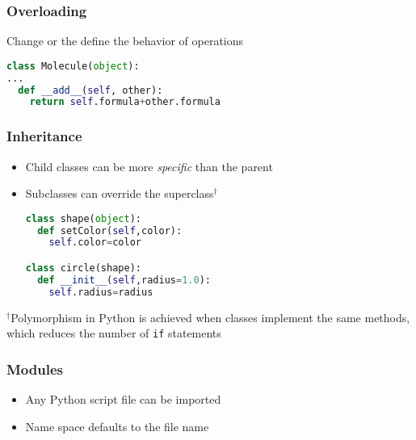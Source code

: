 \documentclass[xcolor=table,10pt,final]{beamer}
\begin{document}
\begin{frame}[fragile]
  \frametitle{Overloading}
  Change or the define the behavior of operations
  \begin{lstlisting}[language=Python]
class Molecule(object):
...
  def __add__(self, other):
    return self.formula+other.formula
  \end{lstlisting}
\end{frame}

\begin{frame}[fragile]
  \frametitle{Inheritance}
  \begin{itemize}
    \item Child classes can be more {\it specific} than the parent\\
    \item Subclasses can override the superclass$^\dagger$\\
\begin{lstlisting}[language=Python]
class shape(object):
  def setColor(self,color):
    self.color=color

class circle(shape):
  def __init__(self,radius=1.0):
    self.radius=radius
\end{lstlisting}
  \end{itemize}
  $^\dagger${\scriptsize Polymorphism in Python is achieved when classes implement the same methods, which reduces the number of {\tt if} statements}
\end{frame}

\begin{frame}
  \frametitle{Modules}
  \begin{itemize}
    \item Any Python script file can be imported
    \item Name space defaults to the file name
  \end{itemize}
\end{frame}
\end{document}
